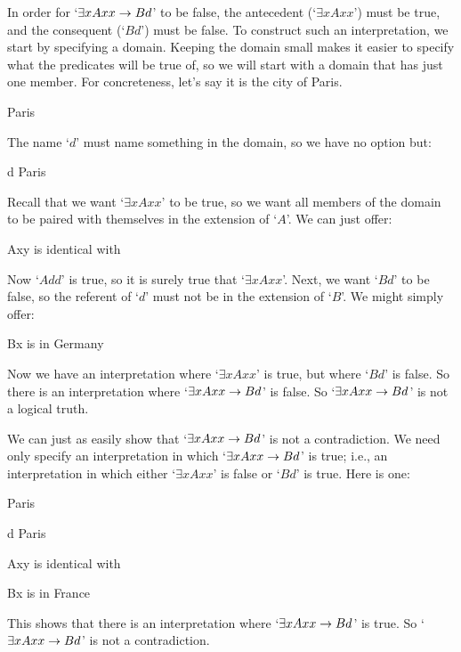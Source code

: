 In order for `$\exists xAxx \rightarrow Bd$' to be false, the antecedent (`$\exists x Axx$') must be true, and the consequent (`$Bd$') must be false. To construct such an interpretation, we start by specifying a domain. Keeping the domain small makes it easier to specify what the predicates will be true of, so we will start with a domain that has just one member. For concreteness, let's say it is the city of Paris. 
	\begin{ekey}
		\item[\text{domain}] Paris
	\end{ekey}
The name `$d$' must name something in the domain, so we have no option but:
	\begin{ekey}
		\item[d] Paris
	\end{ekey}
Recall that we want `$\exists x Axx$' to be true, so we want all members of the domain to be paired with themselves in the extension of `$A$'. We can just offer:
	\begin{ekey}
		\item[Axy]  is identical with 
	\end{ekey}
Now `$Add$' is true, so it is surely true that `$\exists x Axx$'. Next, we want `$Bd$' to be false, so the referent of `$d$' must not be in the extension of `$B$'. We might simply offer:
	\begin{ekey}
		\item[Bx]  is in Germany
	\end{ekey}
Now we have an interpretation where `$\exists x Axx$' is true, but where `$Bd$' is false. So there is an interpretation where `$\exists x Axx \rightarrow Bd$' is false. So `$\exists x Axx \rightarrow Bd$' is not a logical truth.

We can just as easily show that `$\exists xAxx \rightarrow Bd$' is not a contradiction. We need only specify an interpretation in which `$\exists xAxx \rightarrow Bd$' is true; i.e., an interpretation in which either `$\exists x Axx$' is false or `$Bd$' is true. Here is one:
	\begin{ekey}
		\item[\text{domain}] Paris
		\item[d] Paris
		\item[Axy]  is identical with \gap{y}
		\item[Bx]  is in France
	\end{ekey}
This shows that there is an interpretation where `$\exists xAxx \rightarrow Bd$' is true. So `$\exists x Axx \rightarrow Bd$' is not a contradiction.


